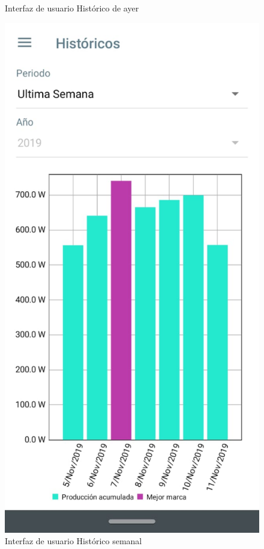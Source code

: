 \begin{figure}[H]
	\caption{Interfaz de usuario Histórico de ayer}
	\label{fig:Historico ayer}
\end{figure}

\begin{figure}[H]
	\centering
	\includegraphics[scale=0.4]{Capitulo4/software/submodulos/images/man26.png}
	\caption{Interfaz de usuario Histórico semanal}
	\label{fig:Historico semanal}
\end{figure}

